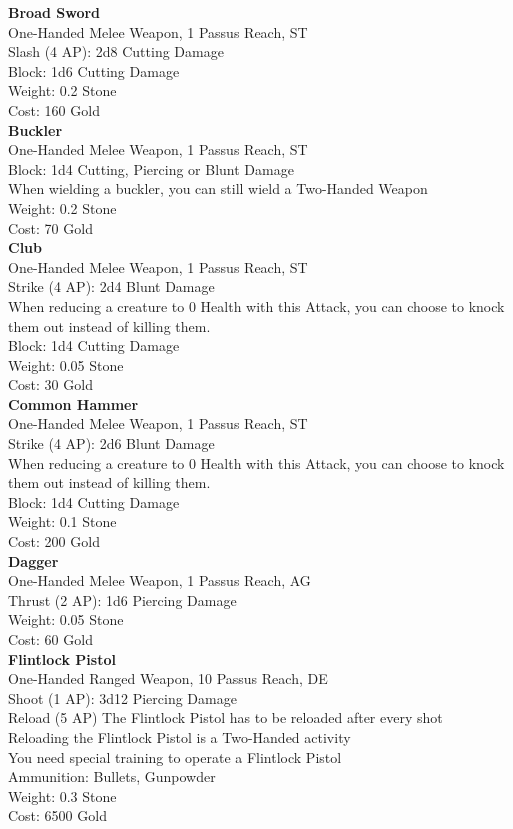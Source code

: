 \textbf{Broad Sword}\\
One-Handed Melee Weapon, 1 Passus Reach, ST\\
Slash (4 AP): 2d8 Cutting Damage\\
Block: 1d6 Cutting Damage\\
Weight: 0.2 Stone\\
Cost: 160 Gold\\


\textbf{Buckler}\\
One-Handed Melee Weapon, 1 Passus Reach, ST\\
Block: 1d4 Cutting, Piercing or Blunt Damage\\
When wielding a buckler, you can still wield a Two-Handed Weapon\\
Weight: 0.2 Stone\\
Cost: 70 Gold\\


\textbf{Club}\\
One-Handed Melee Weapon, 1 Passus Reach, ST\\
Strike (4 AP): 2d4 Blunt Damage\\
When reducing a creature to 0 Health with this Attack, you can choose to knock them out instead of killing them.\\
Block: 1d4 Cutting Damage\\
Weight: 0.05 Stone\\
Cost: 30 Gold\\


\textbf{Common Hammer}\\
One-Handed Melee Weapon, 1 Passus Reach, ST\\
Strike (4 AP): 2d6 Blunt Damage\\
When reducing a creature to 0 Health with this Attack, you can choose to knock them out instead of killing them.\\
Block: 1d4 Cutting Damage\\
Weight: 0.1 Stone\\
Cost: 200 Gold\\


\textbf{Dagger}\\
One-Handed Melee Weapon, 1 Passus Reach, AG\\
Thrust (2 AP): 1d6 Piercing Damage\\
Weight: 0.05 Stone\\
Cost: 60 Gold\\


\textbf{Flintlock Pistol}\\
One-Handed Ranged Weapon, 10 Passus Reach, DE\\
Shoot (1 AP): 3d12 Piercing Damage\\
Reload (5 AP) The Flintlock Pistol has to be reloaded after every shot\\
Reloading the Flintlock Pistol is a Two-Handed activity\\
You need special training to operate a Flintlock Pistol\\
Ammunition: Bullets, Gunpowder\\
Weight: 0.3 Stone\\
Cost: 6500 Gold\\


